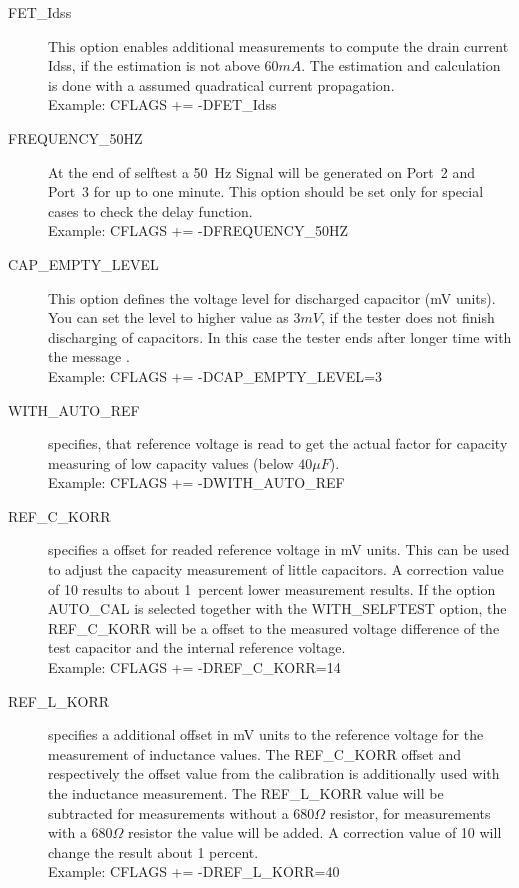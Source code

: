 \begin{description}
 \item[FET\_Idss]
This option enables additional measurements to compute the drain current Idss, if the estimation is not
above \(60mA\). The estimation and calculation is done with a assumed quadratical current propagation.\\
Example: CFLAGS += -DFET\_Idss

  \item[FREQUENCY\_50HZ] At the end of selftest a 50~Hz Signal will be generated on Port~2 and Port~3 for up to one minute.
 This option should be set only for special cases to check the delay function.\\
Example: CFLAGS += -DFREQUENCY\_50HZ

  \item[CAP\_EMPTY\_LEVEL]  This option defines the voltage level for discharged capacitor (mV units).
You can set the level to higher value as \(3mV\), if the tester does not finish discharging of capacitors.
In this case the tester ends after longer time with the message .\\
Example: CFLAGS += -DCAP\_EMPTY\_LEVEL=3

  \item[WITH\_AUTO\_REF] specifies, that reference voltage is read to get the actual factor for capacity measuring of low capacity values (below \(40\mu F\)).\\
Example:  CFLAGS += -DWITH\_AUTO\_REF

  \item[REF\_C\_KORR] specifies a offset for readed reference voltage in mV units.
This can be used to adjust the capacity measurement of little capacitors.
A correction value of 10 results to about 1~percent lower measurement results.
If the option AUTO\_CAL is selected together with the WITH\_SELFTEST option, the REF\_C\_KORR will be
a offset to the measured voltage difference of the test capacitor and the internal reference voltage.\\
Example:  CFLAGS += -DREF\_C\_KORR=14

  \item[REF\_L\_KORR] specifies a additional offset in mV units to the reference voltage for the measurement of
inductance values. 
The REF\_C\_KORR offset and respectively the offset value from the calibration is additionally used with the inductance measurement.
The REF\_L\_KORR value will be subtracted for measurements without a \(680\Omega\) resistor,
for measurements with a \(680\Omega\) resistor the value will be added.
A correction value of 10 will change the result about 1 percent.\\
Example: CFLAGS += -DREF\_L\_KORR=40


\end{description}
